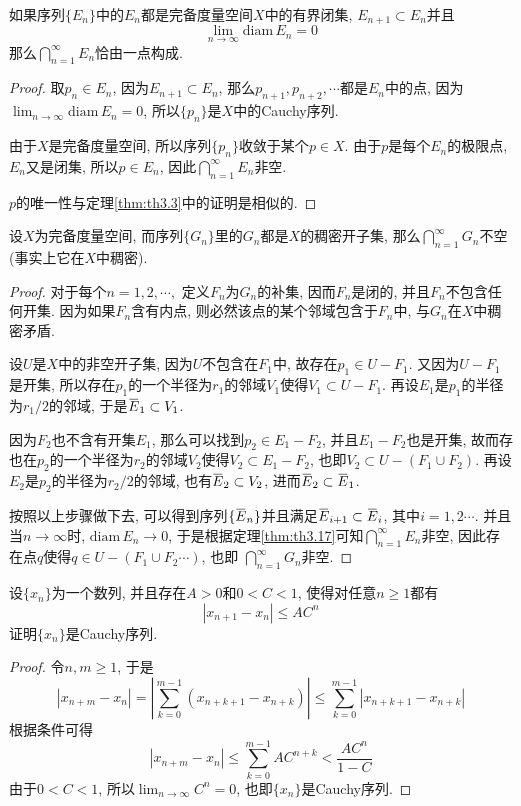 \documentclass[cn,12pt,math=mtpro2,citestyle=gb7714-2015,bibstyle=gb7714-2015,twocol]{elegantbook}
\newcommand{\diam}{\text{diam}\,}
\newcommand{\limn}{\lim_{n\to\infty}}
\newcommand{\overbar}[1]{\mkern 1.5mu\overline{\mkern-1.5mu#1\mkern-1.5mu}\mkern 1.5mu}
\begin{document}
\begin{theorem}\label{thm:th3.17}
  如果序列$\{E_n\}$中的$E_n$都是完备度量空间$X$中的有界闭集, $E_{n+1}\subset E_n$并且
  $$\limn \diam E_n=0$$
  那么$\bigcap_{n=1}^{\infty}E_n$恰由一点构成.
\end{theorem}
\begin{proof}
  取$p_n\in E_n$, 因为$E_{n+1}\subset E_n$, 那么$p_{n+1},p_{n+2},\cdots$都是$E_n$中的点, 因为$\displaystyle\limn \diam E_n=0$, 所以$\{p_n\}$是$X$中的Cauchy序列.

  由于$X$是完备度量空间, 所以序列$\{p_n\}$收敛于某个$p\in X$. 由于$p$是每个$E_n$的极限点, $E_n$又是闭集, 所以$p\in E_n$, 因此$\bigcap_{n=1}^{\infty}E_n$非空.

  $p$的唯一性与定理\ref{thm:th3.3}中的证明是相似的.
\end{proof}
\begin{example}[$\,$Baire定理]
  设$X$为完备度量空间, 而序列$\{G_n\}$里的$G_n$都是$X$的稠密开子集, 那么$\bigcap_{n=1}^{\infty}G_n$不空(事实上它在$X$中稠密).
\end{example}
\begin{proof}
  对于每个$n=1,2,\cdots,$ 定义$F_n$为$G_n$的补集, 因而$F_n$是闭的, 并且$F_n$不包含任何开集. 因为如果$F_n$含有内点, 则必然该点的某个邻域包含于$F_n$中, 与$G_n$在$X$中稠密矛盾.

  设$U$是$X$中的非空开子集, 因为$U$不包含在$F_1$中, 故存在$p_1\in U-F_1$. 又因为$U-F_1$是开集, 所以存在$p_1$的一个半径为$r_1$的邻域$V_1$使得$V_1\subset U-F_1$. 再设$E_1$是$p_1$的半径为$r_1/2$的邻域, 于是$\overbar{E}_1\subset V_1$.

  因为$F_2$也不含有开集$E_1$, 那么可以找到$p_2\in E_1-F_2$, 并且$E_1-F_2$也是开集, 故而存也在$p_2$的一个半径为$r_2$的邻域$V_2$使得$V_2\subset E_1-F_2$, 也即$V_2\subset U-(F_1\cup F_2)$. 再设$E_2$是$p_2$的半径为$r_2/2$的邻域, 也有$\overbar{E}_2\subset V_2$, 进而$\overbar{E}_2\subset \overbar{E}_1$.

  按照以上步骤做下去, 可以得到序列$\{\overbar{E}_n\}$并且满足$\overbar{E}_{i+1}\subset \overbar{E}_i$, 其中$i=1,2\cdots$. 并且当$n\to\infty$时, $\diam E_n\to0$, 于是根据定理\ref{thm:th3.17}可知$\bigcap_{n=1}^{\infty}E_n$非空, 因此存在点$q$使得$q\in U-(F_1\cup F_2\cdots)$, 也即
  $\bigcap_{n=1}^{\infty}G_n$非空.

\end{proof}
\begin{example}
设$\{x_n\}$为一个数列, 并且存在$A>0$和$0<C<1$, 使得对任意$n\ge1$都有
$$|x_{n+1}-x_n|\leq AC^n$$
证明$\{x_n\}$是Cauchy序列.
\end{example}
\begin{proof}
  令$n, m\ge1$, 于是
  $$|x_{n+m}-x_n|=\left|\sum_{k=0}^{m-1}(x_{n+k+1}-x_{n+k})\right|\leq \sum_{k=0}^{m-1}|x_{n+k+1}-x_{n+k}|$$
  根据条件可得
  $$|x_{n+m}-x_n|\leq \sum_{k=0}^{m-1}AC^{n+k}<\frac{AC^n}{1-C}$$
  由于$0<C<1$, 所以$\limn C^n=0$, 也即$\{x_n\}$是Cauchy序列.
\end{proof}
\end{document}
